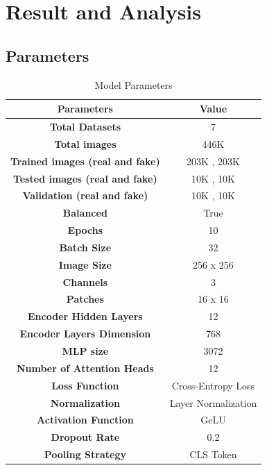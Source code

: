 \section{Result and Analysis}
\subsection{Parameters}
\begin{table}[h]
    \centering
    \renewcommand{\arraystretch}{1.5} %
    \begin{tabular}{|c|c|}
        \hline
        \textbf{Parameters} & \textbf{Value} \\
        \hline
        \textbf{Total Datasets} & 7  \\
        \hline
        \textbf{Total images} & 446K  \\
        \hline
        \textbf{Trained images (real and fake)} & 203K , 203K \\
        \hline
        \textbf{Tested images (real and fake)} & 10K , 10K \\
        \hline
        \textbf{Validation (real and fake)} & 10K , 10K \\
        \hline
        \textbf{Balanced} &  True\\
        \hline
        \textbf{Epochs} &  10\\
        \hline
        \textbf{Batch Size} &  32\\
        \hline
        \textbf{Image Size} &  256 x 256\\
        \hline
        \textbf{Channels} &  3\\
        \hline
        \textbf{Patches} & 16 x 16\\
        \hline
        \textbf{Encoder Hidden Layers} & 12\\
        \hline
        \textbf{Encoder Layers Dimension} & 768\\
        \hline
        \textbf{MLP size} & 3072\\
        \hline
        \textbf{ Number of Attention Heads } & 12\\
        \hline
        \textbf{Loss Function} & Cross-Entropy Loss \\
        \hline
        \textbf{Normalization} & Layer Normalization \\
        \hline
        \textbf{Activation Function} & GeLU \\
        \hline
        \textbf{Dropout Rate } & 0.2  \\
        \hline
        \textbf{Pooling Strategy } & CLS Token \\
        \hline
    \end{tabular}
    \caption{Model Parameters}
    \label{tab:model-parameters}
\end{table}

